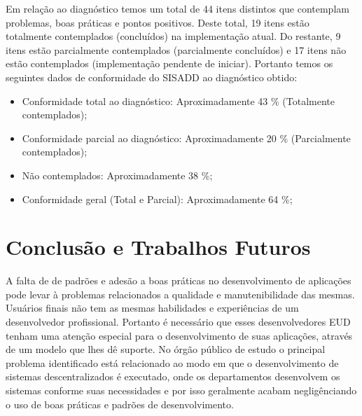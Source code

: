 Em relação ao diagnóstico temos um total de 44 itens distintos que contemplam problemas, boas práticas e pontos positivos. Deste total, 19 itens estão totalmente contemplados (concluídos) na implementação atual. Do restante, 9 itens estão parcialmente contemplados (parcialmente concluídos) e 17 itens não estão contemplados (implementação pendente de iniciar). Portanto temos os seguintes dados de conformidade do SISADD ao diagnóstico obtido:
\begin{itemize}
\item Conformidade total ao diagnóstico: Aproximadamente 43 \% (Totalmente contemplados);
\item Conformidade parcial ao diagnóstico: Aproximadamente 20 \% (Parcialmente contemplados);
\item Não contemplados: Aproximadamente 38 \%;
\item Conformidade geral (Total e Parcial): Aproximadamente 64 \%;
\end{itemize}

\chapter{Conclusão e Trabalhos Futuros}

A falta de de padrões e adesão a boas práticas no desenvolvimento de aplicações pode levar à problemas relacionados a qualidade e manutenibilidade das mesmas. Usuários finais não tem as mesmas habilidades e experiências de um desenvolvedor profissional. Portanto é necessário que esses desenvolvedores EUD tenham uma atenção especial para o desenvolvimento de suas aplicações, através de um modelo que lhes dê suporte. No órgão público de estudo o principal problema identificado está relacionado ao modo em que o desenvolvimento de sistemas descentralizados é executado, onde os departamentos desenvolvem os sistemas conforme suas necessidades e por isso geralmente acabam negligênciando o uso de boas práticas e padrões de desenvolvimento.

